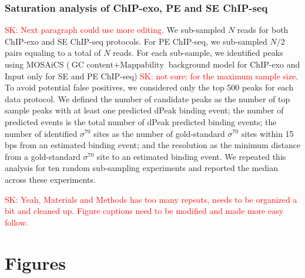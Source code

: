 \documentclass{bmcart}
\newcommand{\SK}[1]{\textcolor{red}{SK: #1}}
\newcommand{\sig}{\sigma^{70}}
\begin{document}
\subsubsection*{Saturation analysis of ChIP-exo, PE and SE ChIP-seq}
\SK{Next paragraph could use more editing.}
We sub-sampled $N$ reads for both ChIP-exo and SE ChIP-seq
protocols. For PE ChIP-seq, we sub-sampled $N/2$ pairs equaling to a total of $N$ reads. 
For each sub-sample, we identified  peaks using MOSAiCS \cite{mosaics}
($\mbox{GC content} + \mbox{Mappability}$ background model for ChIP-exo and
$\mbox{Input only}$ for SE and PE ChIP-seq) \SK{not sure: for the maximum sample
size}. To avoid potential false positives, we considered only the top 500 peaks
for each data protocol. We defined the number of candidate peaks as
the number of top sample peaks with at least one predicted dPeak binding event; the number of
predicted events is the total number of dPeak predicted binding events; the number of identified $\sig$ sites as the number
of gold-standard $\sig$ sites within 15 bps from an estimated binding
event; and the resolution as the   minimum distance from a
gold-standard $\sig$ site to an estimated binding event. We repeated
this analysis for ten random sub-sampling experiments and reported the median across these experiments.


\SK{Yeah, Materials and Methods has too many repeats, needs to be organized a bit and cleaned up. Figure captions need to be modified and made more easy follow. }

  
\nocite{exo_gb}
\nocite{maplot1}
\nocite{maplot2}
\nocite{chipbeyond}
\nocite{meme}






\newpage

\section{Figures}
\end{document}
